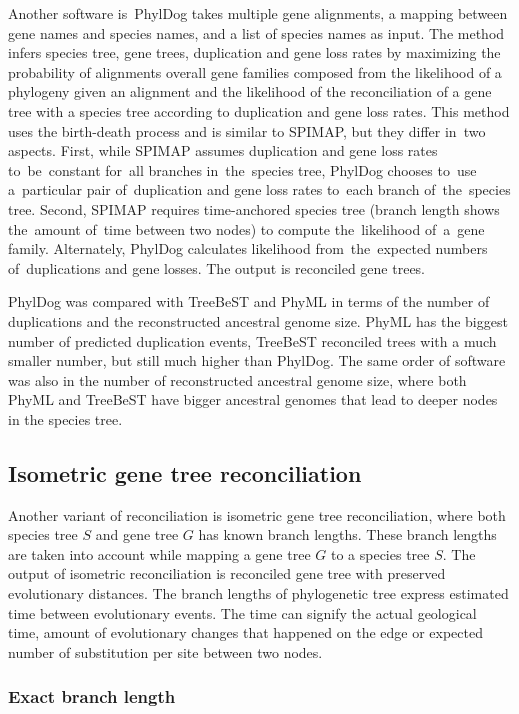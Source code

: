 Another software is~PhylDog \cite{phyldog_online} takes multiple gene alignments, a mapping between gene names and species names, and a list of species names as input. The method infers species tree, gene trees, duplication and gene loss rates by maximizing the probability of alignments overall gene families composed from the likelihood of a phylogeny given an alignment and the likelihood of the reconciliation of a gene tree with a species tree according to duplication and gene loss rates. This method uses the birth-death process and is similar to SPIMAP, but they differ in~two aspects. First, while SPIMAP assumes duplication and gene loss rates to~be~constant for~all branches in~the~species tree, PhylDog chooses to~use a~particular pair of~duplication and gene loss rates to~each branch of~the~species tree. Second, SPIMAP requires time-anchored species tree (branch length shows the~amount of~time between two nodes) to compute the~likelihood of~a~gene family. Alternately, PhylDog calculates likelihood from~the~expected numbers of~duplications and gene losses. The output is reconciled gene trees.

PhylDog was compared with TreeBeST and PhyML \cite{phyldog} in terms of the number of duplications and the reconstructed ancestral genome size. PhyML has the biggest number of predicted duplication events, TreeBeST reconciled trees with a much smaller number, but still much higher than PhylDog. The same order of software was also in the number of reconstructed ancestral genome size, where both PhyML and TreeBeST have bigger ancestral genomes that lead to deeper nodes in the species tree.

\subsection{Isometric gene tree reconciliation}
Another variant of reconciliation is isometric gene tree reconciliation, where both species tree $S$ and gene tree $G$ has known branch lengths. These branch lengths are taken into account while mapping a gene tree $G$ to a species tree $S$. The output of isometric reconciliation is reconciled gene tree with preserved evolutionary distances. The branch lengths of phylogenetic tree express estimated time between evolutionary events. The time can signify the actual geological time, amount of evolutionary changes that happened on the edge or expected number of substitution per site between two nodes.

\subsubsection{Exact branch length}

